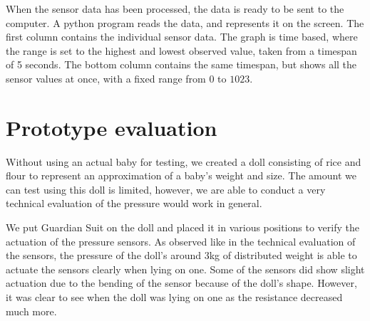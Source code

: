 \documentclass{sigchi-ext}
\begin{document}
When the sensor data has been processed, the data is ready to be sent to the computer. A python program reads the data, and represents it on the screen.
The first column contains the individual sensor data. The graph is time based, where the range is set to the highest and lowest observed value, taken from a timespan of 5 seconds.
The bottom column contains the same timespan, but shows all the sensor values at once, with a fixed range from $0$ to $1023$.


\section{Prototype evaluation}

Without using an actual baby for testing, we created a
doll consisting of rice and flour to represent an
approximation of a baby's weight and size. The amount we 
can test using this doll is limited, however, we are able 
to conduct a very technical evaluation of the pressure 
would work in general.

We put Guardian Suit on the doll and placed it in various
positions to verify the actuation of the pressure sensors.
As observed like in the technical evaluation of the sensors,
the pressure of the doll's around 3kg of distributed weight
is able to actuate the sensors clearly when lying on one. 
Some of the sensors did show slight actuation due to the
bending of the sensor because of the doll's shape. However,
it was clear to see when the doll was lying on one as the 
resistance decreased much more.
\end{document}
